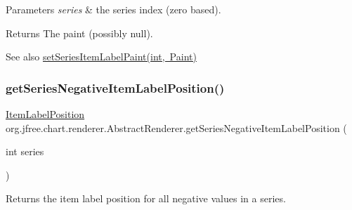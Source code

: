 \begin{DoxyParams}{Parameters}
{\em series} & the series index (zero based).\\
\hline
\end{DoxyParams}
\begin{DoxyReturn}{Returns}
The paint (possibly {\ttfamily null}).
\end{DoxyReturn}
\begin{DoxySeeAlso}{See also}
\mbox{\hyperlink{classorg_1_1jfree_1_1chart_1_1renderer_1_1_abstract_renderer_a62672ca3063e22a4082f430571606ff0}{set\+Series\+Item\+Label\+Paint(int, Paint)}} 
\end{DoxySeeAlso}
\mbox{\label{classorg_1_1jfree_1_1chart_1_1renderer_1_1_abstract_renderer_a2ec8c993651d531262e314d8b1336756}} 
\subsubsection{\texorpdfstring{get\+Series\+Negative\+Item\+Label\+Position()}{getSeriesNegativeItemLabelPosition()}}
{\footnotesize\ttfamily \mbox{\hyperlink{classorg_1_1jfree_1_1chart_1_1labels_1_1_item_label_position}{Item\+Label\+Position}} org.\+jfree.\+chart.\+renderer.\+Abstract\+Renderer.\+get\+Series\+Negative\+Item\+Label\+Position (\begin{DoxyParamCaption}\item[{int}]{series }\end{DoxyParamCaption})}

Returns the item label position for all negative values in a series.


